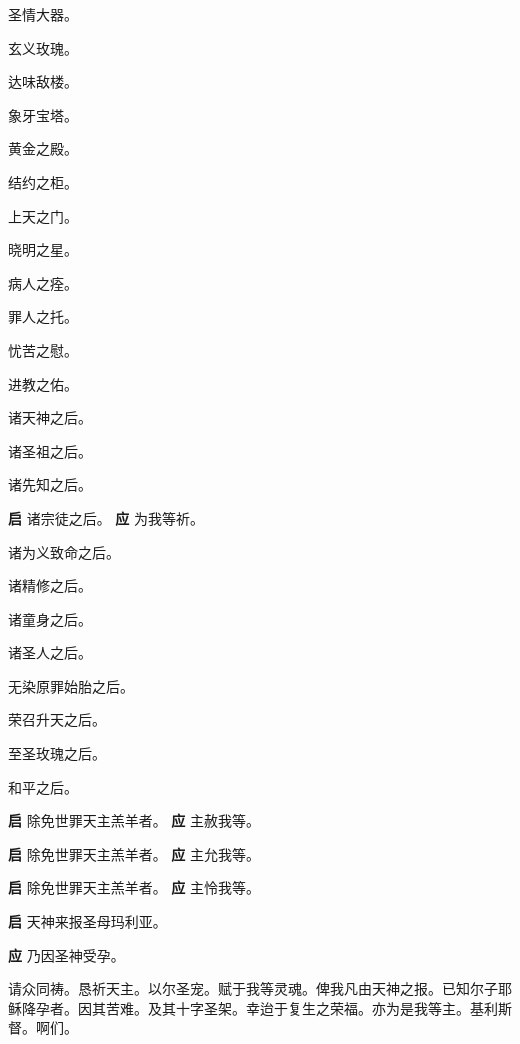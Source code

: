 \documentclass[UTF8,17pt]{ctexart}
\begin{document}
 圣情⼤器。

 ⽞义玫瑰。

 达味敌楼。

 象⽛宝塔。

 黄⾦之殿。

 结约之柜。

 上天之门。

 晓明之星。

 病⼈之痊。

 罪⼈之托。

 忧苦之慰。

 进教之佑。

 诸天神之后。

 诸圣祖之后。

 诸先知之后。

\textbf{启} \quad 诸宗徒之后。 \hfill \textbf{应} \quad 为我等祈。

 诸为义致命之后。

 诸精修之后。

 诸童⾝之后。

 诸圣⼈之后。

 ⽆染原罪始胎之后。

 荣召升天之后。

 ⾄圣玫瑰之后。

 和平之后。

\textbf{启} \quad 除免世罪天主羔⽺者。 \hfill \textbf{应} \quad 主赦我等。

\textbf{启} \quad 除免世罪天主羔⽺者。 \hfill \textbf{应} \quad 主允我等。

\textbf{启} \quad 除免世罪天主羔⽺者。 \hfill \textbf{应} \quad 主怜我等。

\textbf{启} \quad 天神来报圣母玛利亚。

\textbf{应} \quad 乃因圣神受孕。

请众同祷。恳祈天主。以尔圣宠。赋于我等灵魂。俾我凡由天神之报。已知尔⼦耶稣降孕者。因其苦难。及其⼗字圣架。幸迨于复⽣之荣福。亦为是我等主。基利斯督。啊们。
\end{document}
